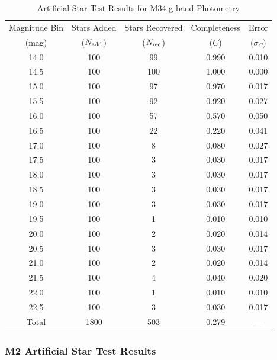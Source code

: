 \documentclass[linenumbers,trackchanges,twocolumn]{aastex701}
\begin{document}
\begin{table}[ht]
\centering
\caption{Artificial Star Test Results for M34 g-band Photometry}
\label{tab:ast_m34}
\begin{tabular}{ccccc}
\hline\hline
Magnitude Bin & Stars Added & Stars Recovered & Completeness & Error \\
(mag) & ($N_{\rm add}$) & ($N_{\rm rec}$) & ($C$) & ($\sigma_C$) \\
\hline
14.0 & 100 & 99 & 0.990 & 0.010 \\
14.5 & 100 & 100 & 1.000 & 0.000 \\
15.0 & 100 & 97 & 0.970 & 0.017 \\
15.5 & 100 & 92 & 0.920 & 0.027 \\
16.0 & 100 & 57 & 0.570 & 0.050 \\
16.5 & 100 & 22 & 0.220 & 0.041 \\
17.0 & 100 & 8 & 0.080 & 0.027 \\
17.5 & 100 & 3 & 0.030 & 0.017 \\
18.0 & 100 & 3 & 0.030 & 0.017 \\
18.5 & 100 & 3 & 0.030 & 0.017 \\
19.0 & 100 & 3 & 0.030 & 0.017 \\
19.5 & 100 & 1 & 0.010 & 0.010 \\
20.0 & 100 & 2 & 0.020 & 0.014 \\
20.5 & 100 & 3 & 0.030 & 0.017 \\
21.0 & 100 & 2 & 0.020 & 0.014 \\
21.5 & 100 & 4 & 0.040 & 0.020 \\
22.0 & 100 & 1 & 0.010 & 0.010 \\
22.5 & 100 & 3 & 0.030 & 0.017 \\
\hline
Total & 1800 & 503 & 0.279 & --- \\
\hline\hline
\end{tabular}
\end{table}

\subsubsection{M2 Artificial Star Test Results}
\end{document}
